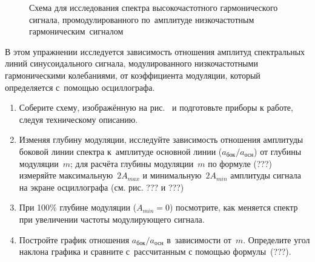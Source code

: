 

\begin{figure}[h!]
\centering
{}
\caption{Схема для исследования спектра высокочастотного гармонического
сигнала, промодулированного по~амплитуде низкочастотным гармоническим~сигналом}
\end{figure}

\begin{lab:task}
В этом упражнении исследуется зависимость отношения амплитуд
спектральных линий синусоидального сигнала, модулированного низкочастотными
гармоническими колебаниями, от коэффициента модуляции, который определяется
с~помощью осциллографа.
\begin{enumerate}
\item Соберите схему, изображённую на рис.~ и подготовьте приборы к работе, следуя техническому
описанию.

\item Изменяя глубину модуляции, исследуйте зависимость
отношения амплитуды боковой линии спектра к~амплитуде основной линии
($a_\text{бок}/a_\text{осн}$) от глубины модуляции~$m$; для расчёта глубины
модуляции~$m$ по формуле (???)
измеряйте максимальную~$2A_{max}$ и минимальную~$2A_{min}$
амплитуды сигнала на экране осциллографа (см. рис. ??? и ???)

\item При 100\% глубине модуляции ($A_{min}=0$) посмотрите, как
меняется спектр при увеличении частоты модулирующего сигнала.

\item Постройте график отношения $a_\text{бок}/a_\text{осн}$
в~зависимости от~$m$. Определите угол наклона графика и сравните с~рассчитанным
с помощью формулы~(???).
\end{enumerate}
\end{lab:task}


